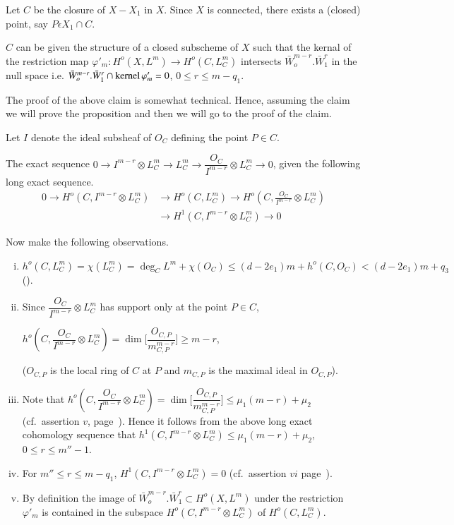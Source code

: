 Let $C$ be the closure of $X - X_1$ in $X$. Since $X$ is connected,
there exists a (closed) point, say $P \epsilon X_1 \cap C$.  

\begin{claim*}
$C$ can be given the structure of a closed subscheme of $X$ such that
  the kernal of the restriction map $\varphi'_m :H^o(X,L^m) \to H^o
  (C, L^m_C)$ intersects $\bar{W}^{m-r}_o. \bar{W}^r_1$ in the null
  space  i.e. $\bar{W}^{m-r}_o. \bar{W}^r_1 \cap \operatorname{kernel} \varphi'_m
  =0$, $0 \le r \le m -q_1$. 
 \end{claim*} 
 
 The proof of the above claim is somewhat technical. 
Hence, assuming the claim we will prove the proposition and then we
will go to the proof of the claim. 
 
 Let $I$ denote the ideal subsheaf of $O_C$ defining the point $P
 \in C$.  
 
 The exact sequence $0 \to I^{m-r} \otimes L^m_C \to L^m_C \to
 \dfrac{O_C}{I^{m-r}} \otimes L^m_C \to 0$, given the following long
 exact sequence. 
 \begin{align*}
 0 \to H^o (C,I^{m-r} \otimes L^m_C) &\to H^o (C,L^m_C) \to H^o(C,
 \frac{O_C}{I^{m-r}} \otimes L^m_C )\\ 
&\to H^1 (C, I^{m-r} \otimes  L^m_C) \to 0 
 \end{align*}
 \pageoriginale
 
 Now make the following observations.
 \begin{enumerate}[i)]
 \item $h^o  (C, L^m_C) = \chi (L^m_C) = \deg_C L^m + \chi (O_C) \le
   (d-2e_1)m + h^o(C,O_C) < (d- 2e_1) m+q_3$  \quad (). 

 \item Since $\dfrac{O_C}{I^{m-r}} \otimes L_C^m$ has support only at
   the point $P \in C$, 

\noindent
$h^o(C, \dfrac{O_C}{I^{m-r}} \otimes
   L_C^m) = \dim \bigg[ \dfrac{O_{C,P}}{m^{m-r}_{C,P}}\bigg] \ge m-r$,

\noindent
   ($O_{C, P}$ is the local ring of $C$ at $P$ and $m_{C,P}$ is the
   maximal ideal in $O_{C,P}$).  

 \item Note that $h^o (C, \dfrac{O_C}{I^{m-r}} \otimes L_C^m ) = \dim
   \bigg[ \dfrac{O_{C,P}}{m^{m-r}_{C,P}}\bigg] \le \mu_1 (m-r) + \mu_2$
   (cf.\ assertion $v$, page~\pageref{c1:as5}). Hence it follows from the above
   long exact cohomology sequence that $h^1(C, I^{m-r} \otimes L^m_C)
   \le \mu_1 (m-r) + \mu_2$, $0 \le r \le m'' -1$.  

\item For $m'' \le r \le m-q_1$, $H^1 (C, I^{m-r} \otimes L^m_C)=0$ 
  (cf.\ assertion $vi$ page~\pageref{c1:as6}). 

\item By definition the image of $\bar{W}^{m-r}_o . \bar{W}^{r}_1
  \subset H^o (X,L^m)$ under the restriction $\varphi'_m$ is contained
  in the subspace $H^o(C, I^{m-r} \otimes L^m_C)$ of $H^o(C,L^m_C)$. 
 \end{enumerate} 
 
